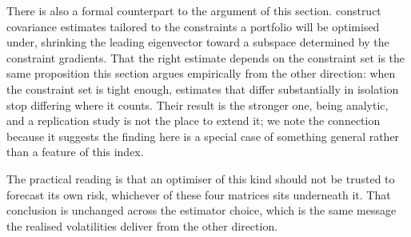 There is also a formal counterpart to the argument of this section.
\citet{goldberg2025eigenvector} construct covariance estimates tailored to the
constraints a portfolio will be optimised under, shrinking the leading
eigenvector toward a subspace determined by the constraint gradients. That the
right estimate depends on the constraint set is the same proposition this
section argues empirically from the other direction: when the constraint set is
tight enough, estimates that differ substantially in isolation stop differing
where it counts. Their result is the stronger one, being analytic, and a
replication study is not the place to extend it; we note the connection because
it suggests the finding here is a special case of something general rather than
a feature of this index.

The practical reading is that an optimiser of this kind should not be trusted
to forecast its own risk, whichever of these four matrices sits underneath it.
That conclusion is unchanged across the estimator choice, which is the same
message the realised volatilities deliver from the other direction.
